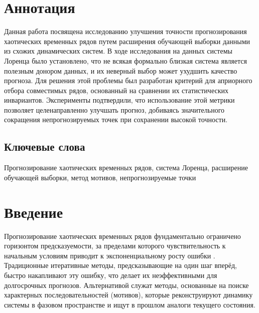 \documentclass[a4paper,12pt]{extarticle}
\begin{document}
\newpage
\section*{Аннотация}
Данная работа посвящена исследованию улучшения точности прогнозирования хаотических временных 
рядов путем расширения обучающей выборки данными из схожих динамических систем. В ходе исследования
 на данных системы Лоренца было установлено, что не всякая формально близкая система является
  полезным донором данных, и их неверный выбор может ухудшить качество прогноза. Для решения 
  этой проблемы был разработан критерий для априорного отбора совместимых
   рядов, основанный на сравнении их статистических инвариантов. Эксперименты подтвердили, что
    использование этой метрики позволяет целенаправленно улучшать прогноз, добиваясь значительного
     сокращения непрогнозируемых точек при сохранении высокой точности.
\subsection*{Ключевые слова}
Прогнозирование хаотических временных рядов, система Лоренца,
расширение обучающей выборки, метод мотивов, непрогнозируемые точки

\newpage
\tableofcontents
\newpage
\section{Введение}
Прогнозирование хаотических временных рядов фундаментально ограничено горизонтом предсказуемости, 
за пределами которого чувствительность к начальным условиям приводит к экспоненциальному росту ошибки
 \cite{MalinetskiyPotapov2002, Gilmore1984}. Традиционные итеративные методы, предсказывающие на один
  шаг вперёд, быстро накапливают эту ошибку, что делает их неэффективными для долгосрочных прогнозов.
   Альтернативой служат методы, основанные на поиске характерных последовательностей (мотивов), которые
    реконструируют динамику системы в фазовом пространстве и ищут в прошлом аналоги текущего состояния.
\end{document}
